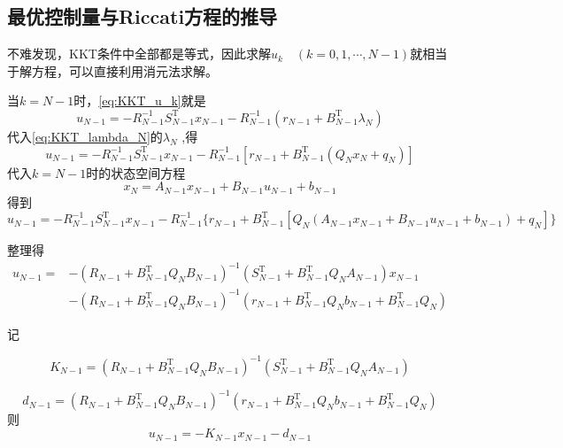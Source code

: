 \documentclass[withoutpreface,bwprint]{NoteBook}
\begin{document}
\subsection{最优控制量与Riccati方程的推导}

不难发现，KKT条件中全部都是等式，因此求解$u_k\quad(k=0,1,\cdots,N-1)$就相当于解方程，可以直接利用消元法求解。

​当$k=N-1$时，\cref{eq:KKT_u_k}就是
$$
u_{N-1} = -R_{N-1}^{-1}S_{N-1}^\mathrm{T}x_{N-1} - R_{N-1}^{-1}\left( r_{N-1} + B_{N-1}^\mathrm{T}\lambda_{N} \right)
$$
代入\cref{eq:KKT_lambda_N}的$\lambda_N$ ,得
$$
u_{N-1} = -R_{N-1}^{-1}S_{N-1}^\mathrm{T}x_{N-1} - R_{N-1}^{-1}\left[ r_{N-1} + B_{N-1}^\mathrm{T} \left(Q_N x_N+ q_N \right) \right]
$$
代入$k=N-1$时的状态空间方程
$$
x_N = A_{N-1}x_{N-1}+ B_{N-1}u_{N-1}+b_{N-1}
$$
得到
\begin{equation}
\label{eq:KKT_u_N_minus_1_substitute_lambda_N_and_x_N}
u_{N-1} = -R_{N-1}^{-1}S_{N-1}^\mathrm{T}x_{N-1} - R_{N-1}^{-1} \{ r_{N-1} + B_{N-1}^\mathrm{T} \left[ Q_N \left( A_{N-1}x_{N-1}+ B_{N-1}u_{N-1}+b_{N-1} \right) + q_N \right] \}
\end{equation}

整理得
\begin{equation}
\label{eq:KKT_u_N_minus_1_detail}
\begin{aligned}
u_{N-1} = &
-\left( R_{N-1}+B_{N-1}^\mathrm{T}Q_N B_{N-1} \right)^{-1} \left( S_{N-1}^\mathrm{T} + B_{N-1}^\mathrm{T} Q_N A_{N-1} \right) x_{N-1} \\
& - \left( R_{N-1}+B_{N-1}^\mathrm{T}Q_N B_{N-1} \right)^{-1} \left( r_{N-1}+ B_{N-1}^\mathrm{T} Q_N b_{N-1}+B_{N-1}^\mathrm{T} Q_N \right)
\end{aligned}
\end{equation}

记

\begin{equation}
\label{eq:KKT_K_N_minus_1}
K_{N-1} = \left( R_{N-1}+B_{N-1}^\mathrm{T}Q_N B_{N-1} \right)^{-1} \left( S_{N-1}^\mathrm{T} + B_{N-1}^\mathrm{T} Q_N A_{N-1} \right) 
\end{equation}

\begin{equation}
\label{eq:KKT_d_N_minus_1}
d_{N-1} = \left( R_{N-1}+B_{N-1}^\mathrm{T}Q_N B_{N-1} \right)^{-1} \left( r_{N-1}+ B_{N-1}^\mathrm{T} Q_N b_{N-1}+B_{N-1}^\mathrm{T} Q_N \right)
\end{equation}
则
\begin{equation}
\label{eq:KKT_u_N_minus_1_normal_type}
u_{N-1}
= - K_{N-1} x_{N-1} - d_{N-1}
\end{equation}
\end{document}
